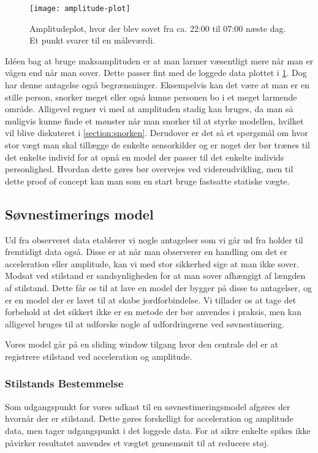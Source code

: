 \begin{figure}[h]
	\centering
	\texttt{[image: amplitude-plot]}
	\caption{Amplitudeplot, hvor der blev sovet fra ca. 22:00 til 07:00 næste dag. Et punkt svarer til en måleværdi.}\label{fig:amplplot}
\end{figure}

Idéen bag at bruge maksamplituden er at man larmer væsentligt mere når man er vågen end når man sover.
Dette passer fint med de loggede data plottet i \cref{fig:amplplot}.
Dog har denne antagelse også begrænsninger.
Eksempelvis kan det være at man er en stille person, snorker meget eller også kunne personen bo i et meget larmende område.
Alligevel regner vi med at amplituden stadig kan bruges, da man så muligvis kunne finde et mønster når man snorker til at styrke modellen, hvilket vil blive diskuteret i \cref{section:snorken}.
Derudover er det så et spørgsmål om hvor stor vægt man skal tillægge de enkelte sensorkilder og er noget der bør trænes til det enkelte individ for at opnå en model der passer til det enkelte individs personlighed.
Hvordan dette gøres bør overvejes ved videreudvikling, men til dette proof of concept kan man som en start bruge fastsatte statiske vægte.

\subsection{Søvnestimerings model}
Ud fra observeret data etablerer vi nogle antagelser som vi går ud fra holder til fremtidigt data også.
Disse er at når man observerer en handling om det er acceleration eller amplitude, kan vi med stor sikkerhed sige at man ikke sover.
Modsat ved stilstand er sandsynligheden for at man sover afhængigt af længden af stilstand.
Dette får os til at lave en model der bygger på disse to antagelser, og er en model der er lavet til at skabe jordforbindelse.
Vi tillader os at tage det forbehold at det sikkert ikke er en metode der bør anvendes i praksis, men kan alligevel bruges til at udforske nogle af udfordringerne ved søvnestimering.

Vores model går på en sliding window tilgang hvor den centrale del er at registrere stilstand ved acceleration og amplitude.
\subsubsection{Stilstands Bestemmelse}
Som udgangspunkt for vores udkast til en søvnestimeringsmodel afgøres der hvornår der er stilstand.
Dette gøres forskelligt for acceleration og amplitude data, men tager udgangspunkt i det loggede data.
For at sikre enkelte spikes ikke påvirker resultatet anvendes et vægtet gennemsnit til at reducere støj.

